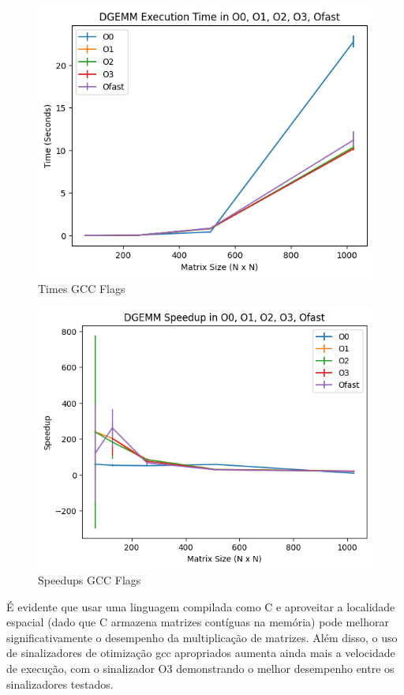 \documentclass[12pt]{article}
\begin{document}
\begin{figure}[h]
    \centering
    \includegraphics[scale=0.6]{figures/times_gcc.png}
    \caption{Times GCC Flags}
    \label{fig:times-gcc-flagsl}
\end{figure}

\begin{figure}[h]
    \centering
    \includegraphics[scale=0.6]{figures/speedups_gcc.png}
    \caption{Speedups GCC Flags}
    \label{fig:speedups-gcc-flags}
\end{figure}

É evidente que usar uma linguagem compilada como C e aproveitar a localidade espacial (dado que C armazena matrizes contíguas na memória) pode melhorar significativamente o desempenho da multiplicação de matrizes. Além disso, o uso de sinalizadores de otimização gcc apropriados aumenta ainda mais a velocidade de execução, com o sinalizador O3 demonstrando o melhor desempenho entre os sinalizadores testados.
\end{document}
